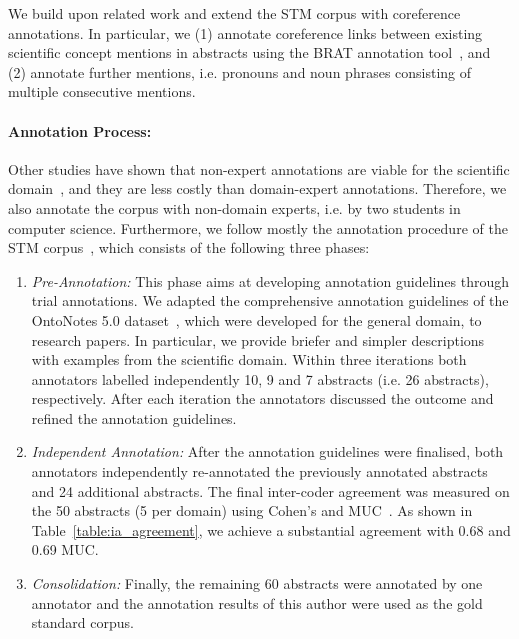 \documentclass[runningheads]{llncs}
\begin{document}
We build upon related work and extend the STM corpus with coreference annotations. In particular, we (1) annotate coreference links between existing scientific concept mentions in abstracts using the BRAT annotation tool~\cite{StenetorpPTOAT12BRAT}, and (2) annotate further mentions, i.e. pronouns and noun phrases consisting of multiple consecutive mentions.

\paragraph{Annotation Process:}
Other studies have shown that non-expert annotations are viable for the scientific domain~\cite{Brack2020DomainindependentEO,Chambers2013,Fisas2015OnTD,SchaferSS12CorefACL,teufel2009towards}, 
and they are less costly than domain-expert annotations.
Therefore, we also annotate the corpus with non-domain experts, i.e. by two students in computer science.
Furthermore, we follow mostly the annotation procedure of the STM corpus~\cite{Brack2020DomainindependentEO}, which consists of the following three phases:
\begin{enumerate}[nosep]

\item \emph{Pre-Annotation:}
This phase aims at developing annotation guidelines through trial annotations.
We adapted the comprehensive annotation guidelines of the OntoNotes 5.0 dataset~\cite{PradhanCoNLL2012}, which were developed for the general domain, to research papers. 
In particular, we provide briefer and simpler descriptions with examples from the scientific domain.
Within three iterations both annotators labelled independently 10, 9 and 7 abstracts (i.e. 26 abstracts), respectively.
After each iteration the annotators discussed the outcome and refined the annotation guidelines.



\item \emph{Independent Annotation:}
After the annotation guidelines were finalised, both annotators independently re-annotated  the previously annotated abstracts and 24 additional abstracts. 
The final inter-coder agreement was measured on the 50 abstracts (5 per domain) using Cohen's  \cite{cohen1960coefficient,Kopec2014} and MUC~\cite{VilainBACH95MUC}.
As shown in Table~\ref{table:ia_agreement}, we achieve a substantial agreement with 0.68  and 0.69 MUC. 


\item \emph{Consolidation:}
Finally, the remaining 60 abstracts were annotated by one annotator and the annotation results of this author were used as the gold standard corpus. 

\end{enumerate}
\end{document}
